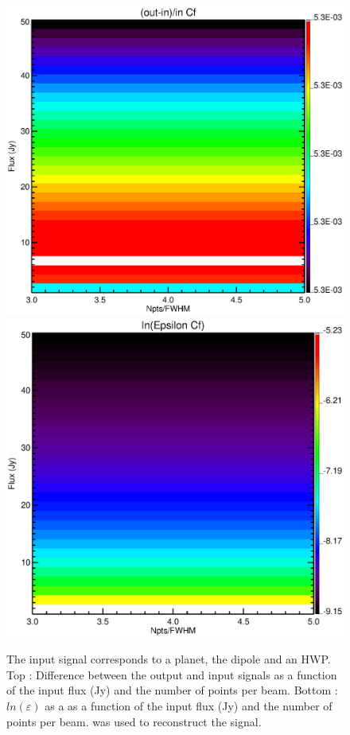 \begin{figure}[h]
\center
	\includegraphics[scale=0.5]{Figures/diff_cf_planet_hwp_dipole.eps}
	\includegraphics[scale=0.5]{Figures/epsilon_cf_planet_hwp_dipole.eps}
	\caption{The input signal corresponds to a planet, the dipole and an HWP. Top : Difference between the output and input signals as a function of the input flux (Jy) and the number of points per beam. Bottom : $ln(\varepsilon)$ as a as a function of the input flux (Jy) and the number of points per beam. \cf was used to reconstruct the signal.}
	\label{fig:epsilon-cf-planet-hwp-dipole}
\end{figure}

